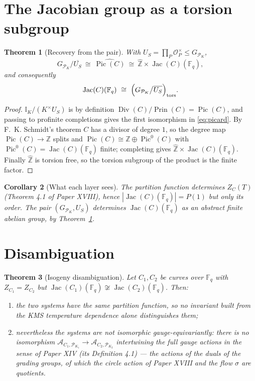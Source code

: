 \documentclass[11pt]{amsart}
\numberwithin{equation}{section}
\newtheorem{theorem}{Theorem}[section]
\newtheorem{corollary}[theorem]{Corollary}
\theoremstyle{definition}
\theoremstyle{remark}
\newcommand{\Z}{\mathbb{Z}}
\newcommand{\F}{\mathbb{F}}
\newcommand{\hZ}{\widehat{\Z}}
\newcommand{\cA}{\mathcal{A}}
\newcommand{\cO}{\mathcal{O}}
\newcommand{\cP}{\mathcal{P}}
\newcommand{\Idl}{\mathbb{I}}
\newcommand{\Pic}{\operatorname{Pic}}
\newcommand{\Jac}{\operatorname{Jac}}
\newcommand{\Div}{\operatorname{Div}}
\newcommand{\Prin}{\operatorname{Prin}}
\newcommand{\tors}{\mathrm{tors}}
\begin{document}
\section{The Jacobian group as a torsion subgroup}

\begin{theorem}[Recovery from the pair]\label{thm:torsion}
With $U_S=\prod_P\cO_P^\times\le G_{\cP_K}$,
\begin{equation}\label{eq:picard}
G_{\cP_K}\big/\overline{U_S}\ \cong\ \widehat{\Pic(C)}\ \cong\ \hZ\times\Jac(C)(\F_q),
\end{equation}
and consequently
\[
\Jac(C)(\F_q)\ \cong\ \Bigl(G_{\cP_K}\big/\overline{U_S}\Bigr)_{\tors}.
\]
\end{theorem}

\begin{proof}
$\Idl_K/(K^\times U_S)$ is by definition $\Div(C)/\Prin(C)=\Pic(C)$, and passing to profinite
completions gives the first isomorphism in \eqref{eq:picard}. By F.~K. Schmidt's theorem
\cite{Rosen} $C$
has a divisor of degree $1$, so the degree map $\Pic(C)\to\Z$ splits and
$\Pic(C)\cong\Z\oplus\Pic^0(C)$ with $\Pic^0(C)=\Jac(C)(\F_q)$ finite; completing gives
$\hZ\times\Jac(C)(\F_q)$. Finally $\hZ$ is torsion free, so the torsion subgroup of the
product is the finite factor.
\end{proof}

\begin{corollary}[What each layer sees]\label{cor:layers}
The partition function determines $Z_C(T)$ (Theorem 4.1 of Paper XVIII), hence
$|\Jac(C)(\F_q)|=P(1)$ but only its order. The pair $(G_{\cP_K},U_S)$ determines
$\Jac(C)(\F_q)$ as an abstract finite abelian group, by Theorem~\ref{thm:torsion}.
\end{corollary}

\section{Disambiguation}

\begin{theorem}[Isogeny disambiguation]\label{thm:disambig}
Let $C_1,C_2$ be curves over $\F_q$ with $Z_{C_1}=Z_{C_2}$ but
$\Jac(C_1)(\F_q)\not\cong\Jac(C_2)(\F_q)$. Then:
\begin{enumerate}
\item the two systems have the \emph{same} partition function, so no invariant built from
the KMS temperature dependence alone distinguishes them;
\item nevertheless the systems are not isomorphic \emph{gauge-equivariantly}: there is no
isomorphism $\cA_{C_1,\cP_{K_1}}\to\cA_{C_2,\cP_{K_2}}$ intertwining the full gauge actions
in the sense of Paper XIV (its Definition 4.1) --- the actions of the duals of the grading
groups, of which the circle action of Paper XVIII and the flow $\sigma$ are quotients.
\end{enumerate}
\end{theorem}
\end{document}
